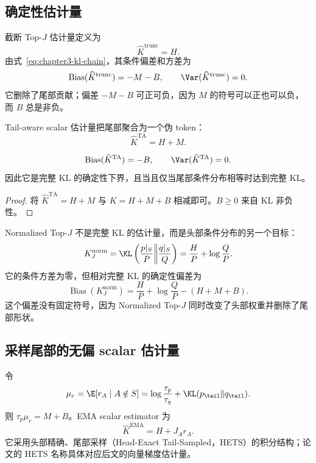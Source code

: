 \subsection{确定性估计量}

截断 Top-$J$ 估计量定义为
\[
 \widehat K^{\mathrm{trunc}}=H.
\]
由式~\eqref{eq:chapter3-kl-chain}，其条件偏差和方差为
\begin{equation}
 \operatorname{Bias}(\widehat K^{\mathrm{trunc}})=-M-B,
 \qquad
 \Var(\widehat K^{\mathrm{trunc}})=0.
 \label{eq:chapter3-trunc-bias-var}
\end{equation}
它删除了尾部贡献；偏差 $-M-B$ 可正可负，因为 $M$ 的符号可以正也可以负，而 $B$ 总是非负。

Tail-aware scalar 估计量把尾部聚合为一个伪 token：
\[
 \widehat K^{\mathrm{TA}}=H+M.
\]

\begin{proposition}
\label{prop:chapter3-ta-scalar}
\[
 \operatorname{Bias}(\widehat K^{\mathrm{TA}})=-B,
 \qquad
 \Var(\widehat K^{\mathrm{TA}})=0.
\]
因此它是完整 KL 的确定性下界，且当且仅当尾部条件分布相等时达到完整 KL。
\end{proposition}

\begin{proof}
将 $\widehat K^{\mathrm{TA}}=H+M$ 与 $K=H+M+B$ 相减即可。$B\geq0$ 来自 KL 非负性。
\end{proof}

Normalized Top-$J$ 不是完整 KL 的估计量，而是头部条件分布的另一个目标：
\[
 K^{\mathrm{norm}}_J
 =\KL\left(\frac{p|_S}{P}\middle\|\frac{q|_S}{Q}\right)
 =\frac{H}{P}+\log\frac{Q}{P}.
\]
它的条件方差为零，但相对完整 KL 的确定性偏差为
\begin{equation}
 \operatorname{Bias}(K^{\mathrm{norm}}_J)
 =\frac{H}{P}+\log\frac{Q}{P}-(H+M+B).
 \label{eq:chapter3-normalized-bias}
\end{equation}
这个偏差没有固定符号，因为 Normalized Top-$J$ 同时改变了头部权重并删除了尾部形状。

\subsection{采样尾部的无偏 scalar 估计量}

令
\[
 \mu_r=\E[r_A\mid A\notin S]
 =\log\frac{\tau_p}{\tau_q}+\KL(p_\tail\Vert q_\tail).
\]
则 $\tau_p\mu_r=M+B$。EMA scalar estimator 为
\begin{equation}
 \widehat K^{\mathrm{EMA}}=H+J_A r_A.
 \label{eq:chapter3-ema-scalar}
\end{equation}
它采用头部精确、尾部采样（Head-Exact Tail-Sampled，HETS）的积分结构；论文的 HETS 名称具体对应后文的向量梯度估计量。

